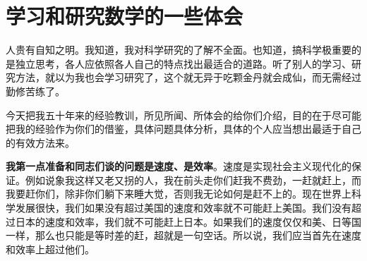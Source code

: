 \documentclass[twoside,openright,headings=optiontohead]{ctexbook} %
\begin{document}
	\frontmatter
%			
\newpage
{\color{TEXTColor}
		\tableofcontents
	\newpage
	\mainmatter

\mainmatter

\hypertarget{ux5b66ux4e60ux548cux7814ux7a76ux6570ux5b66ux7684ux4e00ux4e9bux4f53ux4f1a}{%
\chapter*{学习和研究数学的一些体会}\label{ux5b66ux4e60ux548cux7814ux7a76ux6570ux5b66ux7684ux4e00ux4e9bux4f53ux4f1a}}

人贵有自知之明。我知道，我对科学研究的了解不全面。也知道，搞科学极重要的是独立思考，各人应依照各人自己的特点找出最适合的道路。听了别人的学习、研究方法，就以为我也会学习研究了，这个就无异于吃颗金丹就会成仙，而无需经过勤修苦练了。

今天把我五十年来的经验教训，所见所闻、所体会的给你们介绍，目的在于尽可能把我的经验作为你们的借鉴，具体问题具体分析，具体的个人应当想出最适于自己的有效方法来。

\textbf{我第一点准备和同志们谈的问题是速度、是效率}。速度是实现社会主义现代化的保证。例如说象我这样又老又拐的人，我在前头走你们赶我不费劲，一赶就赶上，而我要赶你们，除非你们躺下来睡大觉，否则我无论如何是赶不上的。现在世界上科学发展很快，我们如果没有超过美国的速度和效率就不可能赶上美国。我们没有超过日本的速度和效率，我们就不可能赶上日本。如果我们的速度仅仅和美、日等国一样，那么也只能是等时差的赶，超就是一句空话。所以说，我们应当首先在速度和效率上超过他们。

}
\end{document}
